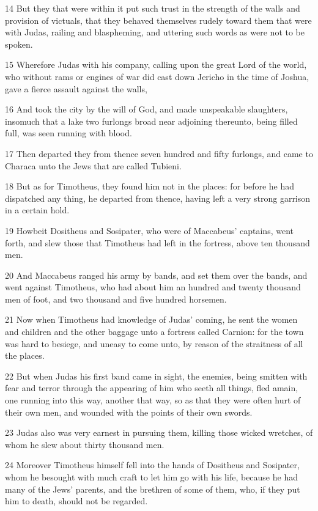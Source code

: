 \par 14 But they that were within it put such trust in the strength of the walls and provision of victuals, that they behaved themselves rudely toward them that were with Judas, railing and blaspheming, and uttering such words as were not to be spoken.
\par 15 Wherefore Judas with his company, calling upon the great Lord of the world, who without rams or engines of war did cast down Jericho in the time of Joshua, gave a fierce assault against the walls,
\par 16 And took the city by the will of God, and made unspeakable slaughters, insomuch that a lake two furlongs broad near adjoining thereunto, being filled full, was seen running with blood.
\par 17 Then departed they from thence seven hundred and fifty furlongs, and came to Characa unto the Jews that are called Tubieni.
\par 18 But as for Timotheus, they found him not in the places: for before he had dispatched any thing, he departed from thence, having left a very strong garrison in a certain hold.
\par 19 Howbeit Dositheus and Sosipater, who were of Maccabeus' captains, went forth, and slew those that Timotheus had left in the fortress, above ten thousand men.
\par 20 And Maccabeus ranged his army by bands, and set them over the bands, and went against Timotheus, who had about him an hundred and twenty thousand men of foot, and two thousand and five hundred horsemen.
\par 21 Now when Timotheus had knowledge of Judas' coming, he sent the women and children and the other baggage unto a fortress called Carnion: for the town was hard to besiege, and uneasy to come unto, by reason of the straitness of all the places.
\par 22 But when Judas his first band came in sight, the enemies, being smitten with fear and terror through the appearing of him who seeth all things, fled amain, one running into this way, another that way, so as that they were often hurt of their own men, and wounded with the points of their own swords.
\par 23 Judas also was very earnest in pursuing them, killing those wicked wretches, of whom he slew about thirty thousand men.
\par 24 Moreover Timotheus himself fell into the hands of Dositheus and Sosipater, whom he besought with much craft to let him go with his life, because he had many of the Jews' parents, and the brethren of some of them, who, if they put him to death, should not be regarded.
